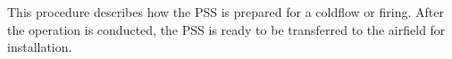 This procedure describes how the PSS is prepared for a coldflow or firing. After the operation is conducted, the PSS is ready to be transferred to the airfield for installation. 

